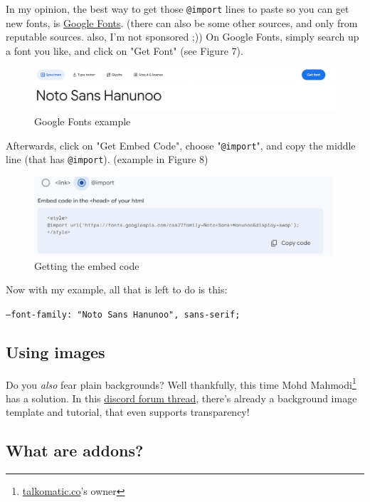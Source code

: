\documentclass{article}
\begin{document}
In my opinion, the best way to get those \texttt{@import} lines to paste so you can get new fonts, is \href{https://fonts.google.com}{Google Fonts}. (there can also be some other sources, and only from reputable sources. also, I'm not sponsored ;))
On Google Fonts, simply search up a font you like, and click on "Get Font" (see Figure 7).
\begin{figure}
    \centering
    \includegraphics[width=1\linewidth]{7.png}
    \caption{Google Fonts example}
    \label{fig:enter-label}
\end{figure}
Afterwards, click on "Get Embed Code", choose "\texttt{@import}", and copy the middle line (that has \texttt{@import}). (example in Figure 8)
\begin{figure}
    \centering
    \includegraphics[width=1\linewidth]{8.png}
    \caption{Getting the embed code}
    \label{fig:enter-label}
\end{figure}
Now with my example, all that is left to do is this:
\begin{tcolorbox}[colback=green!5!white,colframe=green!75!black,title=Integrating the font]
  \texttt{--font-family: "Noto Sans Hanunoo", sans-serif;}
\end{tcolorbox}

\subsection{Using images}

Do you \textit{also} fear plain backgrounds? Well thankfully, this time Mohd Mahmodi\footnote{\url{talkomatic.co}'s owner} has a solution. In this \href{https://discord.com/channels/1252540401072607355/1277166363051556965}{discord forum thread}, there's already a background image template and tutorial, that even supports transparency!

\subsection{What are addons?}
\end{document}
